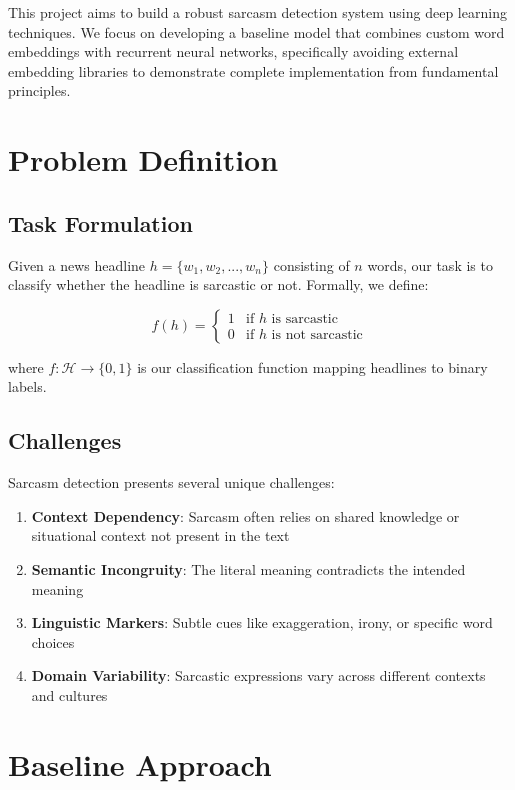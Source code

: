 \documentclass[11pt]{article}
\begin{document}
This project aims to build a robust sarcasm detection system using deep learning techniques. We focus on developing a baseline model that combines custom word embeddings with recurrent neural networks, specifically avoiding external embedding libraries to demonstrate complete implementation from fundamental principles.

\section{Problem Definition}

\subsection{Task Formulation}
Given a news headline $h = \{w_1, w_2, ..., w_n\}$ consisting of $n$ words, our task is to classify whether the headline is sarcastic or not. Formally, we define:

\begin{equation}
f(h) = \begin{cases} 
1 & \text{if } h \text{ is sarcastic} \\
0 & \text{if } h \text{ is not sarcastic}
\end{cases}
\end{equation}

where $f: \mathcal{H} \rightarrow \{0, 1\}$ is our classification function mapping headlines to binary labels.

\subsection{Challenges}
Sarcasm detection presents several unique challenges:

\begin{enumerate}
    \item \textbf{Context Dependency}: Sarcasm often relies on shared knowledge or situational context not present in the text
    \item \textbf{Semantic Incongruity}: The literal meaning contradicts the intended meaning
    \item \textbf{Linguistic Markers}: Subtle cues like exaggeration, irony, or specific word choices
    \item \textbf{Domain Variability}: Sarcastic expressions vary across different contexts and cultures
\end{enumerate}

\section{Baseline Approach}
\end{document}
